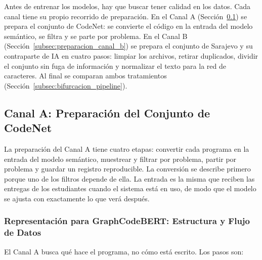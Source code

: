 Antes de entrenar los modelos, hay que buscar tener calidad en los datos. Cada canal tiene su propio recorrido de preparación. En el Canal A (Sección~\ref{subsec:seleccion_codenet}) se prepara el conjunto de CodeNet: se convierte el código en la entrada del modelo semántico, se filtra y se parte por problema. En el Canal B (Sección~\ref{subsec:preparacion_canal_b}) se prepara el conjunto de Sarajevo y su contraparte de IA en cuatro pasos: limpiar los archivos, retirar duplicados, dividir el conjunto sin fuga de información y normalizar el texto para la red de caracteres. Al final se comparan ambos tratamientos (Sección~\ref{subsec:bifurcacion_pipeline}).

\subsection{Canal A: Preparación del Conjunto de CodeNet}
\label{subsec:seleccion_codenet}

La preparación del Canal A tiene cuatro etapas: convertir cada programa en la entrada del modelo semántico, muestrear y filtrar por problema, partir por problema y guardar un registro reproducible. La conversión se describe primero porque uno de los filtros depende de ella. La entrada es la misma que reciben las entregas de los estudiantes cuando el sistema está en uso, de modo que el modelo se ajusta con exactamente lo que verá después.

\subsubsection{Representación para GraphCodeBERT: Estructura y Flujo de Datos}
\label{subsec:prep_semantica}

El Canal A busca qué hace el programa, no cómo está escrito. Los pasos son:

